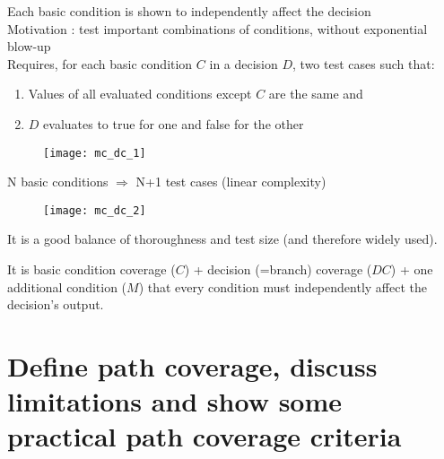 \begin{enumerate}
    \begin{minipage}{0.7\textwidth}
        Each basic condition is shown to independently affect the decision\\
        Motivation : test important combinations of conditions, without exponential blow-up\\
        Requires, for each basic condition $C$ in a decision $D$, two test cases such that:
        \begin{enumerate}
            \item Values of all evaluated conditions except $C$ are the same and 
            \item $D$ evaluates to true for one and false for the other
        \end{enumerate}
    \end{minipage}
    \hfill
    \begin{minipage}{0.22\textwidth}
    \begin{figure}[H]
        \centering
        \texttt{[image: mc\_dc\_1]}
    \end{figure}
    \end{minipage}
    N basic conditions $\Rightarrow$ N+1 test cases (linear complexity)
    \begin{figure}[H]
        \centering
        \texttt{[image: mc\_dc\_2]}
    \end{figure}
    It is a good balance of thoroughness and test size (and therefore widely used).

    It is basic condition coverage ($C$) + decision (=branch) coverage ($DC$) + one additional condition ($M$) that every condition must independently affect the decision’s output.
\end{enumerate}

\section{Define path coverage, discuss limitations and show some practical path coverage criteria}

